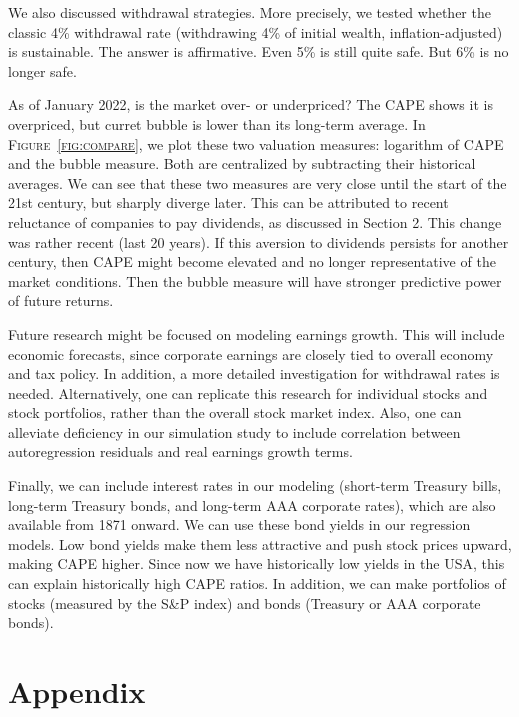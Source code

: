 \documentclass[12pt]{amsart}
\theoremstyle{definition}
\begin{document}
We also discussed withdrawal strategies. More precisely, we tested whether the classic 4\% withdrawal rate (withdrawing 4\% of initial wealth, inflation-adjusted) is sustainable. The answer is affirmative. Even 5\% is still quite safe. But 6\% is no longer safe. 

As of January 2022, is the market over- or underpriced? The CAPE shows it is overpriced, but curret bubble is lower than its long-term average. In \textsc{Figure~\ref{fig:compare}}, we plot these two valuation measures: logarithm of CAPE and the bubble measure. Both are centralized by subtracting their historical averages. We can see that these two measures are very close until the start of the 21st century, but sharply diverge later. This can be attributed to recent reluctance of companies to pay dividends, as discussed in Section 2. This change was rather recent (last 20 years). If this aversion to dividends persists for another century, then CAPE might become elevated and no longer representative of the market conditions. Then the bubble measure will have stronger predictive power of future returns. 

Future research might be focused on modeling earnings growth. This will include economic forecasts, since corporate earnings are closely tied to overall economy and tax policy. In addition, a more detailed investigation for withdrawal rates is needed. Alternatively, one can replicate this research for individual stocks and stock portfolios, rather than the overall stock market index. Also, one can alleviate deficiency in our simulation study to include correlation between autoregression residuals and real earnings growth terms. 

Finally, we can include interest rates in our modeling (short-term Treasury bills, long-term Treasury bonds, and long-term AAA corporate rates), which are also available from 1871 onward. We can use these bond yields in our regression models.  Low bond yields make them less attractive and push stock prices upward, making CAPE higher. Since now we have historically low yields in the USA, this can explain historically high CAPE ratios. In addition, we can make portfolios of stocks (measured by the S\&P index) and bonds (Treasury or AAA corporate bonds). 

\section{Appendix}
\end{document}
